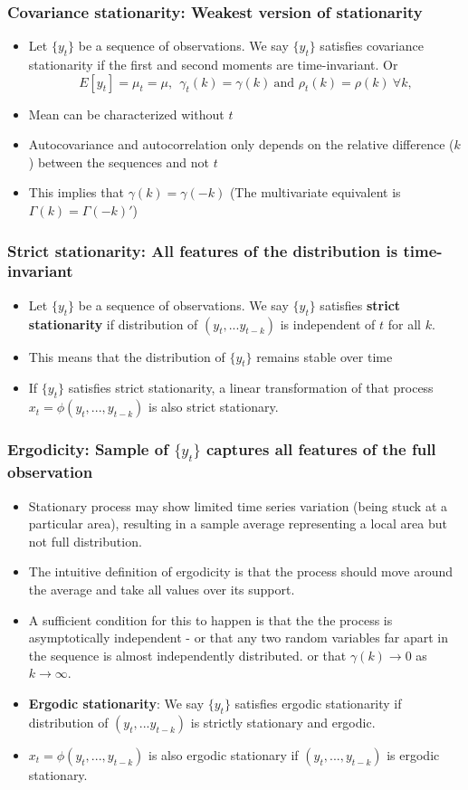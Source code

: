 \documentclass[aspectratio=169]{beamer}
\begin{document}
\begin{frame}
\frametitle{Covariance stationarity: Weakest version of stationarity}
\begin{itemize}
\item Let $\{y_t\}$ be a sequence of observations. We say $\{y_t\}$ satisfies covariance stationarity if the first and second moments are time-invariant. Or
\[
E[y_t]=\mu_t=\mu, \ \ \gamma_t(k)=\gamma(k) \ \text{and }\rho_t(k)=\rho(k) \ \forall k,  
\]
\item Mean can be characterized without $t$ 
\item Autocovariance and autocorrelation only depends on the relative difference ($k$) between the sequences and not $t$
\item This implies that $\gamma(k)=\gamma(-k)$ (The multivariate equivalent is $\Gamma(k)=\Gamma(-k)'$)
\end{itemize}
\end{frame}

\begin{frame}
\frametitle{Strict stationarity: All features of the distribution is time-invariant}
\begin{itemize}
\item Let $\{y_t\}$ be a sequence of observations. We say $\{y_t\}$ satisfies \textbf{strict stationarity} if distribution of $(y_t,...y_{t-k})$ is independent of $t$ for all $k$. 
\item This means that the distribution of $\{y_t\}$ remains stable over time
\item If $\{y_t\}$ satisfies strict stationarity, a linear transformation of that process $x_t = \phi(y_t,...,y_{t-k})$ is also strict stationary.
\end{itemize}
\end{frame}

\begin{frame}
\frametitle{Ergodicity: Sample of $\{y_t\}$ captures all features of the full observation}
\begin{itemize}
\item Stationary process may show limited time series variation (being stuck at a particular area), resulting in a sample average representing a local area but not full distribution. 
\item The intuitive definition of ergodicity is that the process should move around the average and take all values over its support.
\item  A sufficient condition for this to happen is that the the process is asymptotically independent - or that any two random variables far apart in the sequence is almost independently distributed. or that $\gamma(k)\to 0$ as $k\to\infty$.  
\item \textbf{Ergodic stationarity}: We say $\{y_t\}$ satisfies ergodic stationarity if distribution of $(y_t,...y_{t-k})$ is strictly stationary and ergodic. 
\item $x_t=\phi(y_t,...,y_{t-k})$ is also ergodic stationary if $(y_t,...,y_{t-k})$ is ergodic stationary.
\end{itemize}
\end{frame}
\end{document}
